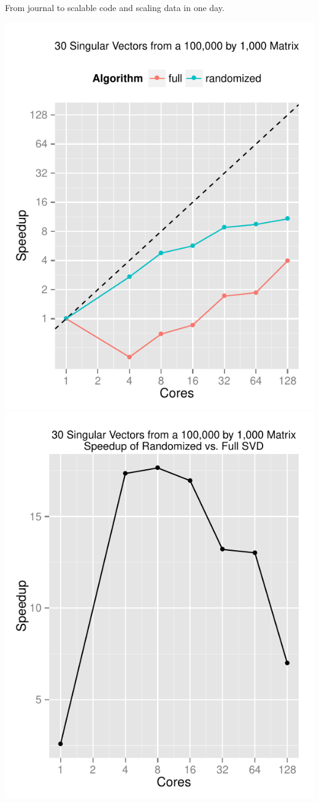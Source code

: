 \begin{frame}
  \begin{block}{From journal to scalable code and scaling data in one day.}
    \begin{center}
      \includegraphics[width=.4\textwidth]{../common/pics/randsvd/randSVDspeedup}
      \hspace{1cm}
      \includegraphics[width=.4\textwidth]{../common/pics/randsvd/randSpeedupSVD}
    \end{center}
  \end{block}
\end{frame}
